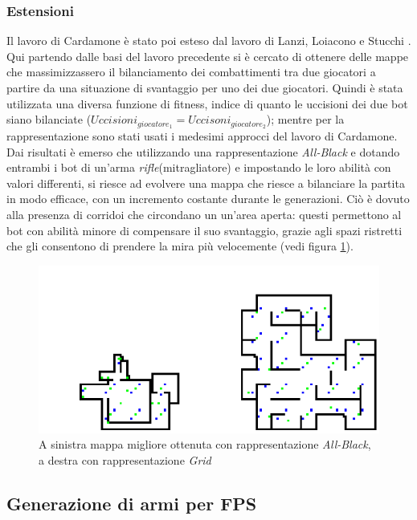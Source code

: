 \documentclass[12pt, italian]{toptesi}
\begin{document}
\subsubsection{Estensioni}
Il lavoro di Cardamone è stato poi esteso dal lavoro di Lanzi, Loiacono e Stucchi \cite{stucchi:article}.
Qui partendo dalle basi del lavoro precedente si è cercato di ottenere delle mappe che massimizzassero il bilanciamento dei combattimenti tra due giocatori a partire da una situazione di svantaggio per uno dei due giocatori.
Quindi è stata utilizzata una diversa funzione di fitness, indice di quanto le uccisioni dei due bot siano bilanciate ($Uccisioni_{giocatore_1} = Uccisoni_{giocatore_2}$);
mentre per la rappresentazione sono stati usati i medesimi approcci del lavoro di Cardamone.
Dai risultati è emerso che utilizzando una rappresentazione \emph{All-Black} e dotando entrambi i bot di un'arma \emph{rifle}(mitragliatore) e impostando le loro abilità con valori differenti, si riesce ad evolvere una mappa che riesce a bilanciare la partita in modo efficace, con un incremento costante durante le generazioni. Ciò è dovuto alla presenza di corridoi che circondano un un'area aperta: questi permettono al bot con abilità minore di compensare il suo svantaggio, grazie agli spazi ristretti che gli consentono di prendere la mira più velocemente (vedi figura \ref{fig:grind_digger_stucchi}).

\begin{figure}
\centering
\includegraphics[width=1.0\textwidth]{stucchi_best}
\caption{A sinistra mappa migliore ottenuta con rappresentazione \emph{All-Black}, a destra con rappresentazione \emph{Grid}}
\label{fig:grind_digger_stucchi}
\end{figure}

\subsection{Generazione di armi per FPS}
\end{document}
